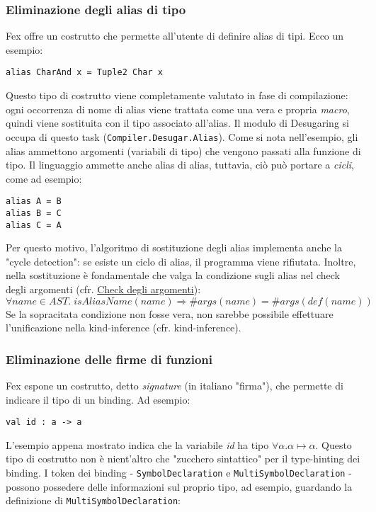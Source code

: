 \documentclass[10pt,a4paper]{article}
\begin{document}
\hypertarget{Eliminazione degli alias di tipo}{\subsubsection{Eliminazione degli alias di tipo}}
Fex offre un costrutto che permette all'utente di definire alias di tipi. Ecco un esempio:
\begin{lstlisting}
alias CharAnd x = Tuple2 Char x
\end{lstlisting}
Questo tipo di costrutto viene completamente valutato in fase di compilazione: ogni occorrenza di nome di alias viene
trattata come una vera e propria \textit{macro}, quindi viene sostituita con il tipo associato all'alias. Il modulo di
Desugaring si occupa di questo task (\texttt{Compiler.Desugar.Alias}).
Come si nota nell'esempio, gli alias ammettono argomenti (variabili di tipo) che vengono passati alla funzione di tipo.
Il linguaggio ammette anche alias di alias, tuttavia, ciò può portare a \textit{cicli}, come ad esempio:

\begin{lstlisting}
alias A = B
alias B = C
alias C = A
\end{lstlisting}

Per questo motivo, l'algoritmo di sostituzione degli alias implementa anche la "cycle detection": se esiste un ciclo di
alias, il programma viene rifiutata. Inoltre, nella
sostituzione è fondamentale che valga la condizione sugli alias nel check degli argomenti
(cfr. \hyperlink{Check degli argomenti}{Check degli argomenti}):
    \[ \forall name \in AST. \; isAliasName(name) \Longrightarrow \#args(name) = \#args(def(name)) \]
Se la sopracitata condizione non fosse vera, non sarebbe possibile effettuare l'unificazione nella kind-inference (cfr.
kind-inference).

\hypertarget{Eliminazione delle firme di funzioni}{\subsubsection{Eliminazione delle firme di funzioni}}
Fex espone un costrutto, detto \textit{signature} (in italiano "firma"), che permette di indicare il tipo di un
binding. Ad esempio:

\begin{lstlisting}
val id : a -> a
\end{lstlisting}

L'esempio appena mostrato indica che la variabile \textit{id} ha tipo $ \forall \alpha. \alpha \mapsto \alpha $. Questo
tipo di costrutto non è nient'altro che "zucchero sintattico" per il type-hinting dei binding. I token dei binding
- \texttt{SymbolDeclaration} e \texttt{MultiSymbolDeclaration} - possono possedere delle informazioni sul proprio tipo,
ad esempio, guardando la definizione di \texttt{MultiSymbolDeclaration}:
\end{document}
